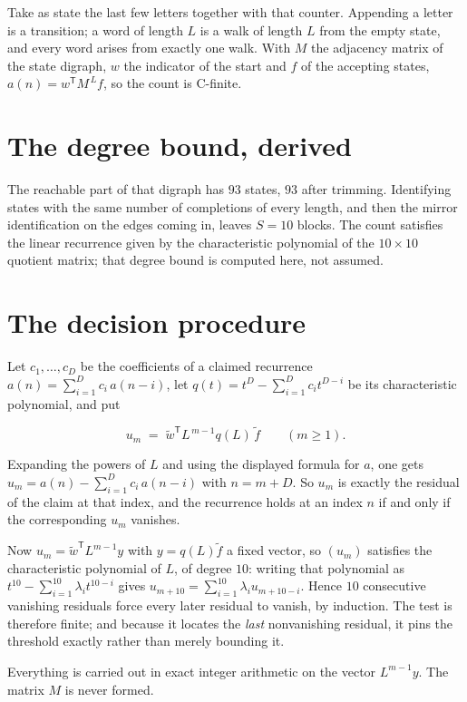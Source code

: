 \documentclass[11pt]{article}
\theoremstyle{definition}
\begin{document}
Take as state the last few letters together with that counter. Appending a letter is a transition; a word of length $L$ is a walk of length $L$ from the empty state, and every word arises from exactly one walk. With $M$ the adjacency matrix of the state digraph, $w$ the indicator of the start and $f$ of the accepting states, $a(n) = w^{\mathsf T}M^{\,L}f$, so the count is C-finite.

\section{The degree bound, derived}

The reachable part of that digraph has $93$ states, $93$ after trimming. Identifying states with the same number of completions of every length, and then the mirror identification on the edges coming in, leaves $S = 10$ blocks. The count satisfies the linear recurrence given by the characteristic polynomial of the $10\times10$ quotient matrix; that degree bound is computed here, not assumed.

\section{The decision procedure}

Let $c_1,\dots,c_D$ be the coefficients of a claimed recurrence $a(n) = \sum_{i=1}^{D} c_i\,a(n-i)$, let $q(t) = t^{D} - \sum_{i=1}^{D} c_i t^{D-i}$ be its characteristic polynomial, and put

\[u_m \;=\; \tilde w^{\mathsf T} L^{\,m-1} q(L)\,\tilde f \qquad (m \ge 1).\]

Expanding the powers of $L$ and using the displayed formula for $a$, one gets $u_m = a(n) - \sum_{i=1}^{D} c_i\,a(n-i)$ with $n = m + D$. So $u_m$ is exactly the residual of the claim at that index, and the recurrence holds at an index $n$ if and only if the corresponding $u_m$ vanishes.

Now $u_m = \tilde w^{\mathsf T} L^{m-1} y$ with $y = q(L)\tilde f$ a fixed vector, so $(u_m)$ satisfies the characteristic polynomial of $L$, of degree $10$: writing that polynomial as $t^{10} - \sum_{i=1}^{10} \lambda_i t^{10-i}$ gives $u_{m+10} = \sum_{i=1}^{10} \lambda_i u_{m+10-i}$. Hence $10$ consecutive vanishing residuals force every later residual to vanish, by induction. The test is therefore finite; and because it locates the {\itshape last} nonvanishing residual, it pins the threshold exactly rather than merely bounding it.

Everything is carried out in exact integer arithmetic on the vector $L^{m-1}y$. The matrix $M$ is never formed.
\end{document}
